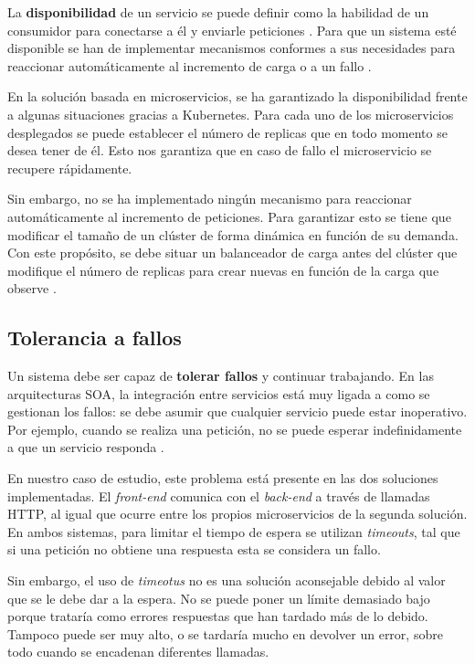 \documentclass[11pt,spanish,listoffigures]{tfgetsinf}
\begin{document}
La \textbf{disponibilidad} de un servicio se puede definir como la habilidad de un consumidor para conectarse a él y enviarle peticiones \cite{Richards2016}. Para que un sistema esté disponible se han de implementar mecanismos conformes a sus necesidades para reaccionar automáticamente al incremento de carga o a un fallo \cite{Newman2015a}.

En la solución basada en microservicios, se ha garantizado la disponibilidad frente a algunas situaciones gracias a Kubernetes. Para cada uno de los microservicios desplegados se puede establecer el número de replicas que en todo momento se desea tener de él. Esto nos garantiza que en caso de fallo el microservicio se recupere rápidamente. 

Sin embargo, no se ha implementado ningún mecanismo para reaccionar automáticamente al incremento de peticiones. Para garantizar esto se tiene que modificar el tamaño de un clúster de forma dinámica en función de su demanda. Con este propósito, se debe situar un balanceador de carga antes del clúster que modifique el número de replicas para crear nuevas en función de la carga que observe \cite{Rensin2015}.

\subsection{Tolerancia a fallos}

Un sistema debe ser capaz de \textbf{tolerar fallos} y continuar trabajando. En las arquitecturas SOA, la integración entre servicios está muy ligada a como se gestionan los fallos: se debe asumir que cualquier servicio puede estar inoperativo. Por ejemplo, cuando se realiza una petición, no se puede esperar indefinidamente a que un servicio responda \cite{Newman2015a}.

En nuestro caso de estudio, este problema está presente en las dos soluciones implementadas. El \textit{front-end} comunica con el \textit{back-end} a través de llamadas HTTP, al igual que ocurre entre los propios microservicios de la segunda solución. En ambos sistemas, para limitar el tiempo de espera se utilizan \textit{timeouts}, tal que si una petición no obtiene una respuesta esta se considera un fallo.

Sin embargo, el uso de \textit{timeotus} no es una solución aconsejable debido al valor que se le debe dar a la espera. No se puede poner un límite demasiado bajo porque trataría como errores respuestas que han tardado más de lo debido. Tampoco puede ser muy alto, o se tardaría mucho en devolver un error, sobre todo cuando se encadenan diferentes llamadas.
\end{document}
